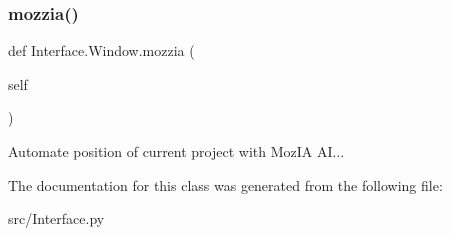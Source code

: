 \subsubsection{\texorpdfstring{mozzia()}{mozzia()}}
{\footnotesize\ttfamily def Interface.\+Window.\+mozzia (\begin{DoxyParamCaption}\item[{}]{self }\end{DoxyParamCaption})}



Automate position of current project with Moz\+IA AI... 



The documentation for this class was generated from the following file\+:\begin{DoxyCompactItemize}
\item 
src/Interface.\+py\end{DoxyCompactItemize}
